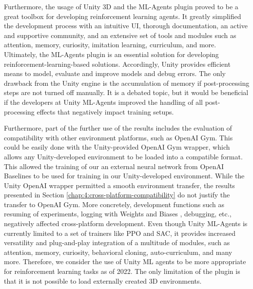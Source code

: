     
    Furthermore, the usage of Unity 3D and the ML-Agents plugin proved to be a great toolbox for developing reinforcement learning agents. It greatly simplified the development process with an intuitive UI, thorough documentation, an active and supportive community, and an extensive set of tools and modules such as attention, memory, curiosity, imitation learning, curriculum, and more.
     Ultimately, the ML-Agents plugin is an essential solution for developing reinforcement-learning-based solutions. Accordingly, Unity provides efficient means to model, evaluate and improve models and debug errors. The only drawback from the Unity engine is the accumulation of memory if post-processing steps are not turned off manually. It is a debated topic, but it would be beneficial if the developers at Unity ML-Agents improved the handling of all post-processing effects that negatively impact training setups.
     
    Furthermore, part of the further use of the results includes the evaluation of compatibility with other environment platforms, such as OpenAI Gym. 
    This could be easily done with the Unity-provided OpenAI Gym wrapper, which allows any Unity-developed environment to be loaded into a compatible format.
    This allowed the training of our an external neural network from OpenAI Baselines \cite{github-dlr-rm-baselines3} to be used for training in our Unity-developed environment. While the Unity OpenAI wrapper permitted a smooth environment transfer, the results presented in Section \ref{chap:4:cross-platform-compatibility} do not justify the transfer to OpenAI Gym. 
    More concretely, development functions such as resuming of experiments, logging with Weights and Biases \cite{wandb2022}, debugging, etc., negatively affected cross-platform development. 
    Even though Unity ML-Agents is currently limited to a set of trainers like PPO and SAC, it provides increased versatility and plug-and-play integration of a multitude of modules, such as attention, memory, curiosity, behavioral cloning, auto-curriculum, and many more. Therefore, we consider the use of Unity ML agents to be more appropriate for reinforcement learning tasks as of 2022. The only limitation of the plugin is that it is not possible to load externally created 3D environments.


